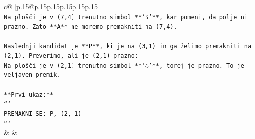 \documentclass{article}
\begin{document}
{\begin{supertabular}{c@{$\;$}|p{.15\linewidth}@{}p{.15\linewidth}p{.15\linewidth}p{.15\linewidth}p{.15\linewidth}p{.15\linewidth}}
{{{\\ 
\texttt{Na plošči je v (7,4) trenutno simbol **'S'**, kar pomeni, da polje ni prazno. Zato **A** ne moremo premakniti na (7,4).} \\
\\ 
\texttt{Naslednji kandidat je **P**, ki je na (3,1) in ga želimo premakniti na (2,1). Preverimo, ali je (2,1) prazno:} \\
\texttt{Na plošči je v (2,1) trenutno simbol **'◌'**, torej je prazno. To je veljaven premik.} \\
\\ 
\texttt{**Prvi ukaz:**} \\
\texttt{```} \\
\texttt{PREMAKNI SE: P, (2, 1)} \\
\texttt{```} \\
            }
        }
    }
    & & \\ \\


\end{supertabular}}
\end{document}
